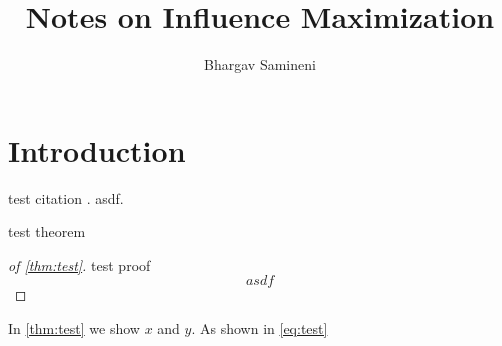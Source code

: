 \documentclass[11pt]{article}
\title{Notes on Influence Maximization}
\author{
    Bhargav Samineni\\
}
\date{}
\begin{document}
    \maketitle  

    \begin{abstract}

    \end{abstract}
    \newpage
 
    \section{Introduction}
    test citation \cite{kempe2003maximizing, kempe2005influential}. \citet{kempe2003maximizing} asdf. 

    \begin{theorem}
        test theorem 
        \label{thm:test}
    \end{theorem}
    \begin{proof}[of \cref{thm:test}]
        test proof
        \begin{equation}
            asdf
            \label{eq:test}
        \end{equation}
    \end{proof}

    In \cref{thm:test} we show \(x\) and \(y\). As shown in \cref{eq:test}

    \newpage

 
\end{document}
